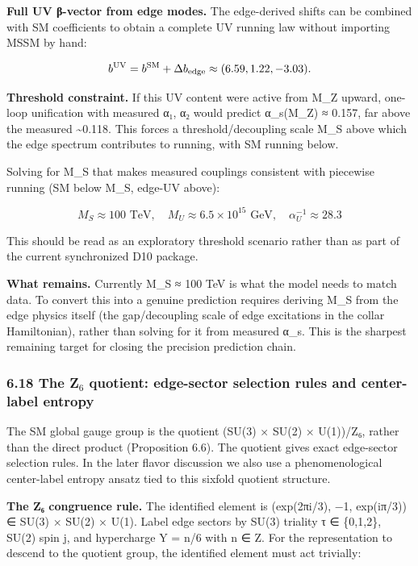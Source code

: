 \textbf{Full UV β-vector from edge modes.} The edge-derived shifts can be combined with SM coefficients to obtain a complete UV running law without importing MSSM by hand:

\[
b^{\rm UV} = b^{\rm SM} + \Delta b_{\rm edge} \approx (6.59, 1.22, -3.03).
\]

\textbf{Threshold constraint.} If this UV content were active from M\_Z upward, one-loop unification with measured α₁, α₂ would predict α\_s(M\_Z) ≈ 0.157, far above the measured \textasciitilde0.118. This forces a threshold/decoupling scale M\_S above which the edge spectrum contributes to running, with SM running below.

Solving for M\_S that makes measured couplings consistent with piecewise running (SM below M\_S, edge-UV above):

\[
M_S \approx 100 \text{ TeV}, \quad M_U \approx 6.5 \times 10^{15} \text{ GeV}, \quad \alpha_U^{-1} \approx 28.3
\]

This should be read as an exploratory threshold scenario rather than as part of the current synchronized D10 package.

\textbf{What remains.} Currently M\_S ≈ 100 TeV is what the model needs to match data. To convert this into a genuine prediction requires deriving M\_S from the edge physics itself (the gap/decoupling scale of edge excitations in the collar Hamiltonian), rather than solving for it from measured α\_s. This is the sharpest remaining target for closing the precision prediction chain.

\subsubsection{6.18 The Z$_6$ quotient: edge-sector selection rules and center-label entropy}\label{618-the-zux2086-quotient-edge-sector-selection-rules-and-center-label-entropy}

The SM global gauge group is the quotient (SU(3) × SU(2) × U(1))/Z₆, rather than the direct product (Proposition 6.6). The quotient gives exact edge-sector selection rules. In the later flavor discussion we also use a phenomenological center-label entropy ansatz tied to this sixfold quotient structure.

\textbf{The Z₆ congruence rule.} The identified element is (exp(2πi/3), −1, exp(iπ/3)) ∈ SU(3) × SU(2) × U(1). Label edge sectors by SU(3) triality τ ∈ \{0,1,2\}, SU(2) spin j, and hypercharge Y = n/6 with n ∈ Z. For the representation to descend to the quotient group, the identified element must act trivially:

